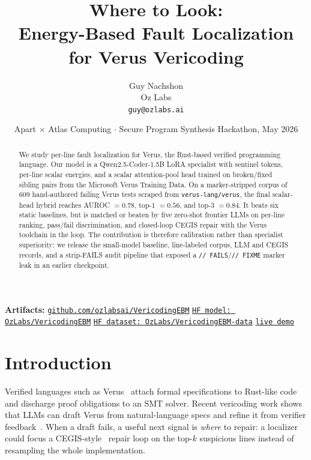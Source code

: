 \documentclass[10pt]{article}
\title{\textbf{Where to Look:\\
  Energy-Based Fault Localization for Verus Vericoding}}
\author{Guy Nachshon \\ \small Oz Labs \\ \small \texttt{guy@ozlabs.ai}}
\date{Apart $\times$ Atlas Computing $\cdot$ Secure Program Synthesis Hackathon, May 2026}
\begin{document}
\maketitle

\begin{center}
\small
\textbf{Artifacts:}
\href{https://github.com/ozlabsai/VericodingEBM}{\texttt{github.com/ozlabsai/VericodingEBM}}\quad
\href{https://huggingface.co/OzLabs/VericodingEBM}{\texttt{HF model: OzLabs/VericodingEBM}}\quad
\href{https://huggingface.co/datasets/OzLabs/VericodingEBM-data}{\texttt{HF dataset: OzLabs/VericodingEBM-data}}\quad
\href{https://ozlabsai.github.io/VericodingEBM}{\texttt{live demo}}
\end{center}

\begin{abstract}
We study per-line fault localization for Verus, the Rust-based
verified programming language. Our model is a Qwen2.5-Coder-1.5B
LoRA specialist with sentinel tokens, per-line scalar energies, and
a scalar attention-pool head trained on broken/fixed sibling pairs
from the Microsoft Verus Training Data. On a marker-stripped corpus
of $609$ hand-authored failing Verus tests scraped from
\texttt{verus-lang/verus}, the final scalar-head hybrid reaches
AUROC $=0.78$, top-1 $=0.56$, and top-3 $=0.84$. It beats six static
baselines, but is matched or beaten by five zero-shot frontier LLMs
on per-line ranking, pass/fail discrimination, and closed-loop CEGIS
repair with the Verus toolchain in the loop. The contribution is
therefore calibration rather than specialist superiority: we release
the small-model baseline, line-labeled corpus, LLM and CEGIS
records, and a strip-FAILS audit pipeline that exposed a
\texttt{// FAILS}/\texttt{// FIXME} marker leak in an earlier
checkpoint.
\end{abstract}

\section{Introduction}
\label{sec:intro}

Verified languages such as Verus~\cite{verus2023} attach formal
specifications to Rust-like code and discharge proof obligations to
an SMT solver. Recent vericoding work shows that LLMs can draft
Verus from natural-language specs and refine it from verifier
feedback~\cite{verus_training_data}. When a draft fails, a useful
next signal is \emph{where} to repair: a localizer could focus a
CEGIS-style~\cite{cegis} repair loop on the top-$k$ suspicious lines
instead of resampling the whole implementation.
\end{document}
